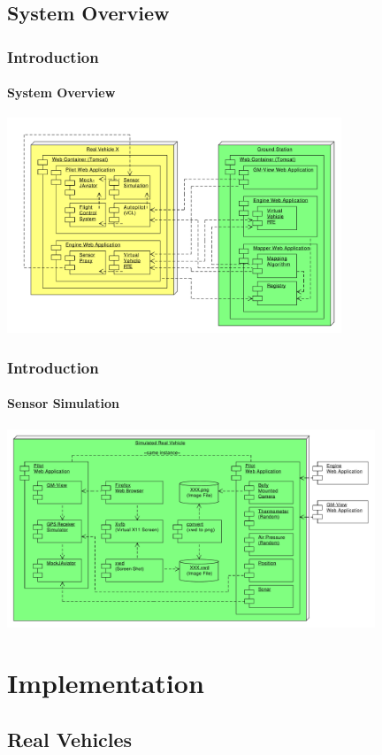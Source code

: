\documentclass{beamer}
\begin{document}
\subsection{System Overview}

\begin{frame}\frametitle{Introduction}\framesubtitle{System Overview}
	\begin{center}
		{\includegraphics[width=10cm]{SystemOverview.pdf}}
	\end{center}
\end{frame}

\begin{frame}\frametitle{Introduction}\framesubtitle{Sensor Simulation}
	\begin{center}
		{\includegraphics[width=11cm]{SensorSimulation-2.pdf}}
	\end{center}
\end{frame}

\section {Implementation}

\subsection{Real Vehicles}
\end{document}
